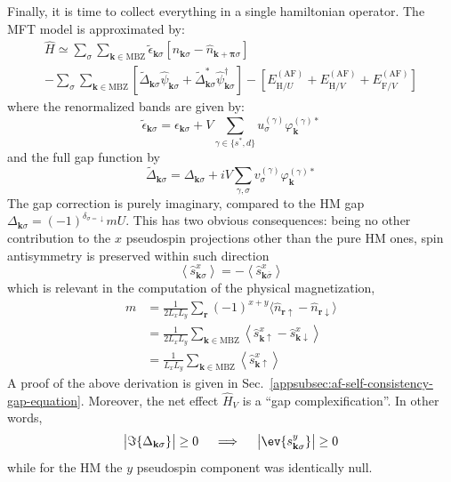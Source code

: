 Finally, it is time to collect everything in a single hamiltonian operator. The MFT model is approximated by:
\begin{multline*}
	\hat H \simeq \sum_\sigma \sum_{\mathbf{k}\in\mathrm{MBZ}} \tilde{\epsilon}_{\mathbf{k}\sigma} \left[
		\hat n_{\mathbf{k}\sigma} - \hat n_{\mathbf{k}+\bm{\pi}\sigma}
	\right] \\
	- \sum_\sigma \sum_{\mathbf{k}\in\mathrm{MBZ}} \left[
		\tilde{\Delta}_{\mathbf{k}\sigma}
		\hat \psi_{\mathbf{k}\sigma} + \tilde{\Delta}_{\mathbf{k}\sigma}^* \hat \psi_{\mathbf{k}\sigma}^\dagger
	\right] - \left[
		E_{\mathrm{H}/U}^{(\mathrm{AF})} + 
		E_{\mathrm{H}/V}^{(\mathrm{AF})} + E_{\mathrm{F}/V}^{(\mathrm{AF})}
	\right]
\end{multline*}
where the renormalized bands are given by:
\[
	\tilde{\epsilon}_{\mathbf{k}\sigma} = \epsilon_{\mathbf{k}\sigma} + V \sum_{\gamma\in\lbrace s^*,d \rbrace} u^{(\gamma)}_\sigma \varphi_{\mathbf{k}}^{(\gamma)*}
\]
and the full gap function by
\[
	\tilde{\Delta}_{\mathbf{k}\sigma} = \Delta_{\mathbf{k}\sigma} + iV \sum_{\gamma,\sigma} v^{(\gamma)}_\sigma \varphi_\mathbf{k}^{(\gamma)*}
\]
The gap correction is purely imaginary, compared to the HM gap $\Delta_{\mathbf{k}\sigma} = (-1)^{\delta_{\sigma=\downarrow}} mU$. This has two obvious consequences: being no other contribution to the $x$ pseudospin projections other than the pure HM ones, spin antisymmetry is preserved within such direction
\[
	\left\langle \hat s_{\mathbf{k}\sigma}^x \right\rangle = -\left\langle \hat s_{\mathbf{k}\overline{\sigma}}^x \right\rangle
\]
which is relevant in the computation of the physical magnetization,
\[
\begin{aligned}
	m &= \frac{1}{2L_xL_y} \sum_\mathbf{r} (-1)^{x+y} \langle
	\hat n_{\mathbf{r}\uparrow} - \hat n_{\mathbf{r}\downarrow}
	\rangle \\
	&= \frac{1}{2L_xL_y} \sum_{\mathbf{k} \in \mathrm{MBZ}} \left\langle
		\hat s_{\mathbf{k}\uparrow}^x - \hat s_{\mathbf{k}\downarrow}^x
	\right\rangle \\
	&= \frac{1}{L_xL_y} \sum_{\mathbf{k} \in \mathrm{MBZ}} \left\langle
		\hat s_{\mathbf{k}\uparrow}^x
	\right\rangle
\end{aligned}
\]
A proof of the above derivation is given in  Sec.~\ref{appsubsec:af-self-consistency-gap-equation}.
Moreover, the net effect $\hat H_V$ is a ``gap complexification''. In other words,
\[
	\big|
		\Im\lbrace\Delta_{\mathbf{k}\sigma}\rbrace
	\big| \ge 0
	\quad\implies\quad
	\big|
		\ev{s_{\mathbf{k}\sigma}^y}
	\big| \ge 0
\]
while for the HM the $y$ pseudospin component was identically null.

